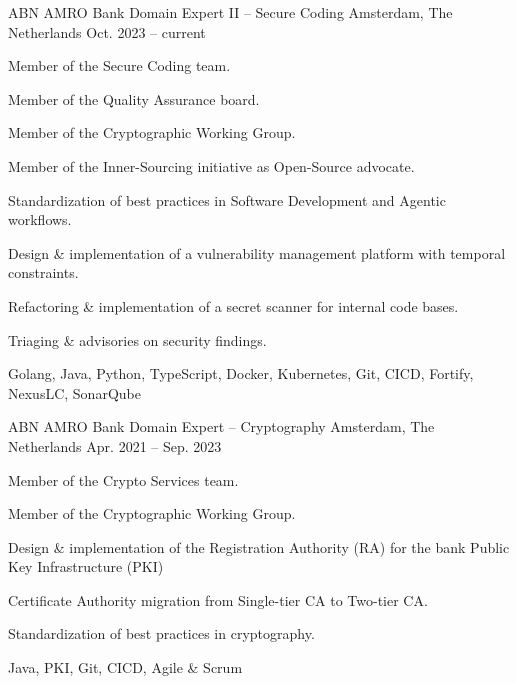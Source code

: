

\begin{cventries}

	\cventrysix%
	{ABN AMRO Bank} %
	{Domain Expert II -- Secure Coding} %
	{Amsterdam, The Netherlands} %
	{Oct. 2023 -- current} %
	{
		\begin{cvitems} %
			\item {Member of the Secure Coding team.}
			\item {Member of the Quality Assurance board.}
			\item {Member of the Cryptographic Working Group.}
			\item {Member of the Inner-Sourcing initiative as Open-Source advocate.}
			\item {Standardization of best practices in Software Development and Agentic workflows.}
			\item {Design \& implementation of a vulnerability management platform with temporal constraints.}
			\item {Refactoring \& implementation of a secret scanner for internal code bases.}
			\item {Triaging \& advisories on security findings.}
		\end{cvitems}
	}%
	{Golang, Java, Python, TypeScript, Docker, Kubernetes, Git, CICD, Fortify, NexusLC, SonarQube}%

	\cventrysix%
	{ABN AMRO Bank} %
	{Domain Expert -- Cryptography} %
	{Amsterdam, The Netherlands} %
	{Apr. 2021 -- Sep. 2023} %
	{
		\begin{cvitems} %
			\item {Member of the Crypto Services team.}
			\item {Member of the Cryptographic Working Group.}
			\item {Design \& implementation of the Registration Authority (RA) for the bank Public Key Infrastructure (PKI)} %
			\item {Certificate Authority migration from Single-tier CA to Two-tier CA.} %
			\item {Standardization of best practices in cryptography.}
		\end{cvitems}
	}%
	{Java, PKI, Git, CICD, Agile \& Scrum}%



\end{cventries}
